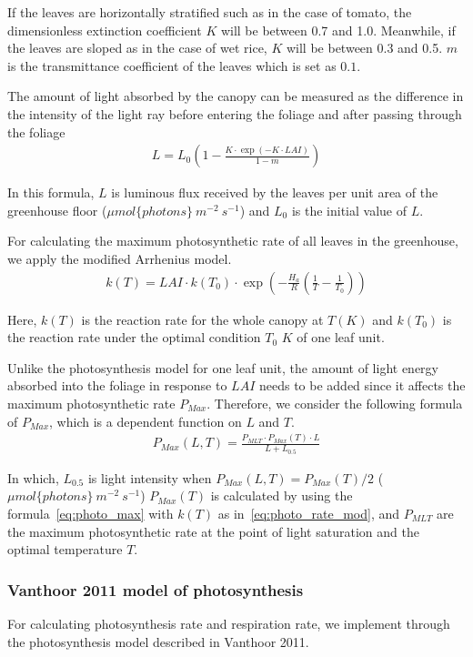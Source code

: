 \documentclass[a4paper]{article}
\numberwithin{equation}{section}
\begin{document}
If the leaves are horizontally stratified such as in the case of tomato, the dimensionless extinction coefficient \( K \) will be between 0.7 and 1.0. Meanwhile, if the leaves are sloped as in the case of wet rice, \( K \) will be between 0.3 and 0.5. \( m \) is the transmittance coefficient of the leaves which is set as \( 0.1 \).

The amount of light absorbed by the canopy can be measured as the difference in the intensity of the light ray before entering the foliage and after passing through the foliage
\begin{align}
  L =L_0 \left(1 - \frac{K \cdot \exp \left(-K \cdot LAI\right)}{1 - m}\right)
\end{align}

In this formula, \( L \) is luminous flux received by the leaves per unit area of the greenhouse floor (\( \mu mol\{photons\}\ m^{-2}\ s^{-1} \)) and \( L_0 \) is the initial value of \( L \).

For calculating the maximum photosynthetic rate of all leaves in the greenhouse, we apply the modified Arrhenius model.
\begin{align}
  \label{eq:photo_rate_mod}
  k(T) = LAI \cdot k(T_0) \cdot \exp \left(-\frac{H_a}{R} \left(\frac{1}{T} - \frac{1}{T_0}\right)\right)
\end{align}

Here, \( k(T) \) is the reaction rate for the whole canopy at \( T(K) \) and \( k(T_0) \) is the reaction rate under the optimal condition \( T_0 \) \( K \) of one leaf unit.

Unlike the photosynthesis model for one leaf unit, the amount of light energy absorbed into the foliage in response to \( LAI \) needs to be added since it affects the maximum photosynthetic rate \( P_{Max} \). Therefore, we consider the following formula of \( P_{Max} \), which is a dependent function on \( L \) and \( T \).
\begin{align}
  P_{Max} (L,T) = \frac{P_{MLT} \cdot P_{Max}(T) \cdot L}{L + L_{0.5}}
\end{align}

In which, \( L_{0.5} \) is light intensity when \( P_{Max} (L,T) = P_{Max}(T)/2 \) (\( \mu mol\{photons\}\ m^{-2}\ s^{-1} \))
\( P_{Max}(T) \) is calculated by using the formula~\eqref{eq:photo_max} with \( k(T) \) as in~\eqref{eq:photo_rate_mod}, and \( P_{MLT} \) are the maximum
photosynthetic rate at the point of light saturation and the optimal temperature \( T \).

\subsubsection{Vanthoor 2011 model of photosynthesis}
For calculating photosynthesis rate and respiration rate, we implement through the photosynthesis model described in Vanthoor 2011.
\end{document}
